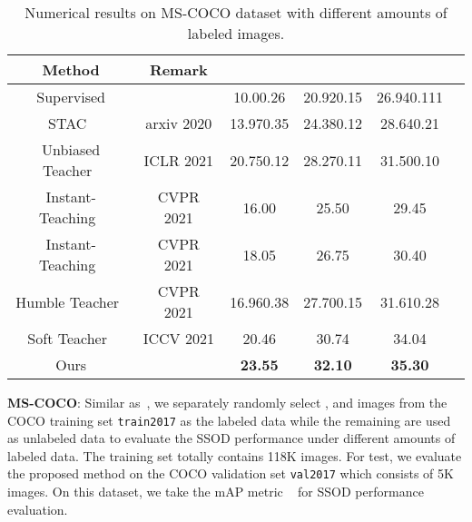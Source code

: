 \documentclass[letterpaper]{article} \usepackage{aaai23}  \usepackage{times}  \usepackage{helvet}  \usepackage{courier}  \usepackage[hyphens]{url}  \usepackage{graphicx} \urlstyle{rm} \def\UrlFont{\rm}  \usepackage{natbib}  \usepackage{caption} \frenchspacing  \setlength{\pdfpagewidth}{8.5in}  \setlength{\pdfpageheight}{11in}  \usepackage{algorithm}
\begin{document}
\begin{table*}[h]  
\centering
    \caption{Numerical results on MS-COCO dataset with different amounts of labeled images.} 
    \begin{tabular}{cccccc}
        \hline
        Method & Remark &  &  &  \\
        \hline
        Supervised & & 10.00.26 & 20.920.15 & 26.940.111 \\
        \hline
        STAC~\cite{sohn2020simple} & arxiv 2020 & 13.970.35 & 24.380.12 & 28.640.21  \\
        Unbiased Teacher~\cite{liu2021unbiased} & ICLR 2021 & 20.750.12 & 28.270.11 & 31.500.10 \\
        Instant-Teaching~\cite{zhou2021instant} & CVPR 2021& 16.00 & 25.50 & 29.45 \\
        Instant-Teaching~\cite{zhou2021instant} & CVPR 2021 & 18.05 & 26.75 & 30.40 \\
        Humble Teacher~\cite{tang2021humble} & CVPR 2021& 16.960.38 & 27.700.15 & 31.610.28 \\
        Soft Teacher~\cite{xu2021end} & ICCV 2021 & 20.46 & 30.74  & 34.04 \\
        Ours & & \textbf{23.55} & \textbf{32.10} & \textbf{35.30} \\
        \hline
    \end{tabular}
    \label{table:COCO_final}
\end{table*}

\noindent\textbf{MS-COCO}: Similar as~\cite{sohn2020simple,zhou2021instant}, we separately randomly select ,  and  images from the COCO training set \texttt{train2017} as the labeled data while the remaining are used as unlabeled data to evaluate the SSOD performance under different amounts of labeled data. The training set totally contains 118K images. For test, we evaluate the proposed method on the COCO validation set \texttt{val2017} which consists of 5K images. On this dataset, we take the mAP metric ~\cite{zhou2021instant,xu2021end} for SSOD performance evaluation.
\end{document}
